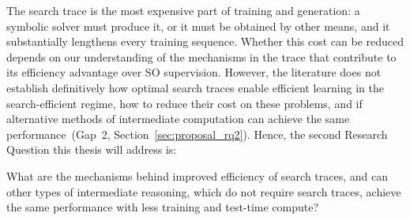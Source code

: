 The search trace is the most expensive part of training and generation: a symbolic solver must produce it, or it must be obtained by other means, and it substantially lengthens every training sequence.
Whether this cost can be reduced depends on our understanding of the mechanisms in the trace that contribute to its efficiency advantage over SO supervision.
However, the literature does not establish definitively how optimal search traces enable efficient learning in the search-efficient regime, how to reduce their cost on these problems, and if alternative methods of intermediate computation can achieve the same performance~(Gap~2, Section~\ref{sec:proposal_rq2}).
Hence, the second Research Question this thesis will address is:

\begin{tcolorbox}[title=Research Question 2, colback=ThesisOrange!5, colframe=ThesisOrange, fonttitle=\bfseries, fontupper=\itshape]
What are the mechanisms behind improved efficiency of search traces, and can other types of intermediate reasoning, which do not require search traces, achieve the same performance with less training and test-time compute?
\end{tcolorbox}

